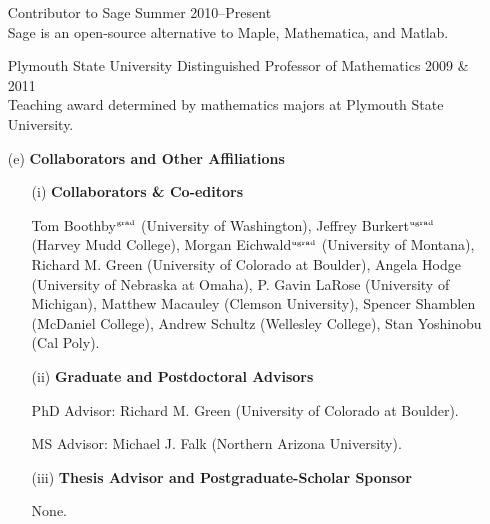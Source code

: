 \documentclass[11pt]{article}
\begin{document}
\begin{enumerate}[leftmargin=*]
\smallskip

Contributor to Sage \hfill Summer 2010--Present\\
Sage is an open-source alternative to Maple, Mathematica, and Matlab.

\smallskip
 
Plymouth State University Distinguished Professor of Mathematics \hfill 2009 \& 2011\\
Teaching award determined by mathematics majors at Plymouth State University.

\item[(e)] \textbf{Collaborators and Other Affiliations} 
 
\begin{enumerate}[leftmargin=\parindent]
\item[(i)] \textbf{Collaborators \& Co-editors}

Tom Boothby$^{\tiny\mbox{grad}}$ (University of Washington),  Jeffrey Burkert$^{\tiny\mbox{ugrad}}$ (Harvey Mudd College), Morgan Eichwald$^{\tiny\mbox{ugrad}}$ (University of Montana), Richard M. Green (University of Colorado at Boulder), Angela Hodge (University of Nebraska at Omaha), P. Gavin LaRose (University of Michigan), Matthew Macauley (Clemson University), Spencer Shamblen (McDaniel College), Andrew Schultz (Wellesley College), Stan Yoshinobu (Cal Poly).
 
\item[(ii)] \textbf{Graduate and Postdoctoral Advisors}

PhD Advisor: Richard M. Green (University of Colorado at Boulder).

\smallskip

MS Advisor: Michael J. Falk (Northern Arizona University).

\item[(iii)] \textbf{Thesis Advisor and Postgraduate-Scholar Sponsor}

None.

\end{enumerate}

\end{enumerate}
\end{document}
